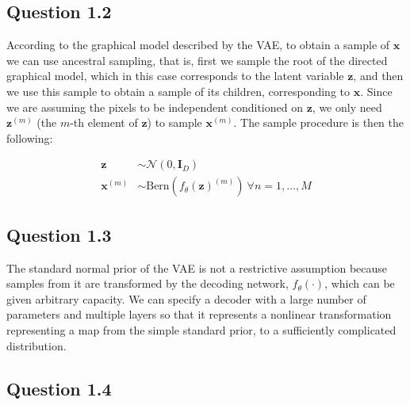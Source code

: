 \documentclass{article}
\begin{document}
\subsection*{Question 1.2}

According to the graphical model described by the VAE, to obtain a sample of $\mathbf{x}$ we can use ancestral sampling, that is, first we sample the root of the directed graphical model, which in this case corresponds to the latent variable $\mathbf{z}$, and then we use this sample to obtain a sample of its children, corresponding to $\mathbf{x}$. Since we are assuming the pixels to be independent conditioned on $\mathbf{z}$, we only need $\mathbf{z}^{(m)}$ (the $m$-th element of $\mathbf{z}$) to sample $\mathbf{x}^{(m)}$. The sample procedure is then the following:

\begin{align*}
\mathbf{z} &\sim \mathcal{N}(0, \mathbf{I}_D)\\
\mathbf{x}^{(m)} &\sim \text{Bern}(f_\theta(\mathbf{z})^{(m)})\ \forall n = 1, \dots, M
\end{align*}

\subsection*{Question 1.3}

The standard normal prior of the VAE is not a restrictive assumption because samples from it are transformed by the decoding network, $f_\theta(\cdot)$, which can be given arbitrary capacity. We can specify a decoder with a large number of parameters and multiple layers so that it represents a nonlinear transformation representing a map from the simple standard prior, to a sufficiently complicated distribution.

\subsection*{Question 1.4}
\end{document}
